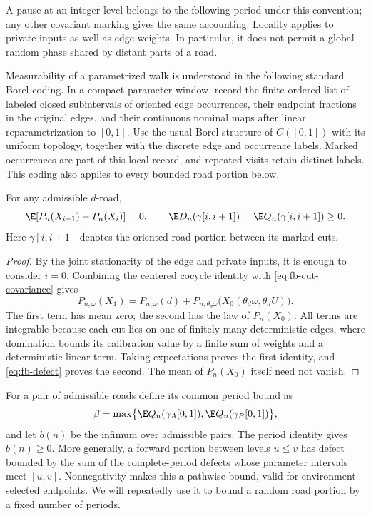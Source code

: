 A pause at an integer level belongs to the following period under
this convention; any other covariant marking gives the same accounting.
Locality applies to private inputs as well as edge weights.  In
particular, it does not permit a global random phase shared by distant
parts of a road.

Measurability of a parametrized walk is understood in the following
standard Borel coding. In a compact parameter window, record the finite
ordered list of labeled closed subintervals of oriented edge occurrences,
their endpoint fractions in the original edges, and their continuous
nominal maps after linear reparametrization to $[0,1]$. Use the usual
Borel structure of $C([0,1])$ with its uniform topology, together with
the discrete edge and occurrence labels. Marked occurrences are part
of this local record, and repeated visits retain distinct labels. This
coding also applies to every bounded road portion below.

\begin{lemma}
\label{lem:fb-random-cuts}
For any admissible $d$-road,
\begin{equation}
 \E [P_n(X_{i+1})-P_n(X_i)]=0,
 \qquad
 \E D_n(\gamma[i,i+1])
 =\E Q_n(\gamma[i,i+1])\ge0.
 \label{eq:fb-period-identity}
\end{equation}
Here $\gamma[i,i+1]$ denotes the oriented road portion between its
marked cuts.
\end{lemma}

\begin{proof}
By the joint stationarity of the edge and private inputs, it is enough
to consider $i=0$.  Combining the
centered cocycle identity with \eqref{eq:fb-cut-covariance} gives
\[
 P_{n,\omega}(X_1)
 =P_{n,\omega}(d)
  +P_{n,\theta_d\omega}
       \bigl(X_0(\theta_d\omega,\theta_dU)\bigr).
\]
The first term has mean zero; the second has the law of $P_n(X_0)$.
All terms are integrable because each cut lies on one of finitely many
deterministic edges, where domination bounds its calibration value by
a finite sum of weights and a deterministic linear term.  Taking
expectations proves the first identity, and \eqref{eq:fb-defect}
proves the second.  The mean of $P_n(X_0)$ itself need not vanish.
\end{proof}

For a pair of admissible roads define its common period bound as
\[
 \beta=\max\bigl\{
 \E Q_n(\gamma_A[0,1]),
 \E Q_n(\gamma_B[0,1])\bigr\},
\]
and let $b(n)$ be the infimum over admissible pairs.  The period
identity gives $b(n)\ge0$.  More generally, a forward portion between
levels $u\le v$ has defect bounded by the sum of the complete-period
defects whose parameter intervals meet $[u,v]$.  Nonnegativity makes
this a pathwise bound, valid for environment-selected endpoints.  We
will repeatedly use it to bound a random road portion by a fixed
number of periods.

